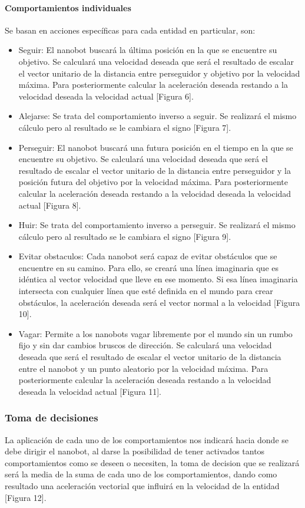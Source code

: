 \paragraph{Comportamientos individuales}
Se basan en acciones específicas para cada entidad en particular, son:  
\begin{itemize}
 \item Seguir: El nanobot buscará la última posición en la que se encuentre su objetivo. Se calculará una velocidad deseada que será el resultado de escalar el vector unitario de la distancia entre perseguidor y objetivo por la velocidad máxima. Para posteriormente calcular la aceleración deseada restando a la velocidad deseada la velocidad actual [Figura 6]. 
 \item Alejarse: Se trata del comportamiento inverso a seguir. Se realizará el mismo cálculo pero al resultado se le cambiara el signo [Figura 7]. 
 \item Perseguir: El nanobot buscará una futura posición en el tiempo en la que se encuentre su objetivo. Se calculará una velocidad deseada que será el resultado de escalar el vector unitario de la distancia entre perseguidor y la posición futura del objetivo por la velocidad máxima. Para posteriormente calcular la aceleración deseada restando a la velocidad deseada la velocidad actual [Figura 8].
 \item Huir: Se trata del comportamiento inverso a perseguir. Se realizará el mismo cálculo pero al resultado se le cambiara el signo [Figura 9]. 
 \item Evitar obstaculos: Cada nanobot será capaz de evitar obstáculos que se encuentre en su camino. Para ello, se creará una línea imaginaria que es idéntica al vector velocidad que lleve en ese momento. Si esa línea imaginaria intersecta con cualquier línea que esté definida en el mundo para crear obstáculos, la aceleración deseada será el vector normal a la velocidad [Figura 10]. 
 \item Vagar: Permite a los nanobots vagar libremente por el mundo sin un rumbo fijo y sin dar cambios bruscos de dirección. Se calculará una velocidad deseada que será el resultado de escalar el vector unitario de la distancia entre el nanobot y  un punto aleatorio  por la velocidad máxima. Para posteriormente calcular la aceleración deseada restando a la velocidad deseada la velocidad actual [Figura 11].  
\end{itemize}

\subsubsection{Toma de decisiones}
\label{sec:toma_decisiones}
La aplicación de cada uno de los comportamientos nos indicará hacia donde se debe dirigir el nanobot, al darse la posibilidad de tener activados tantos comportamientos como se deseen o necesiten, la toma de decision que se realizará será la media de la suma de cada uno de los comportamientos, dando como resultado una aceleración vectorial que influirá en la velocidad de la entidad [Figura 12].

